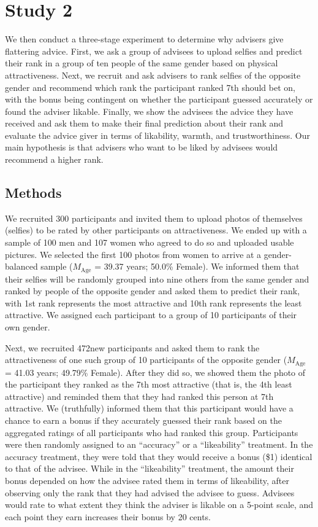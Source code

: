 \documentclass[
  man,floatsintext]{apa6}
\begin{document}
\hypertarget{study-2}{%
\section{Study 2}\label{study-2}}

We then conduct a three-stage experiment to determine why advisers give flattering advice. First, we ask a group of advisees to upload selfies and predict their rank in a group of ten people of the same gender based on physical attractiveness. Next, we recruit and ask advisers to rank selfies of the opposite gender and recommend which rank the participant ranked 7th should bet on, with the bonus being contingent on whether the participant guessed accurately or found the adviser likable. Finally, we show the advisees the advice they have received and ask them to make their final prediction about their rank and evaluate the advice giver in terms of likability, warmth, and trustworthiness. Our main hypothesis is that advisers who want to be liked by advisees would recommend a higher rank.

\hypertarget{methods-1}{%
\subsection{Methods}\label{methods-1}}

We recruited 300 participants and invited them to upload photos of themselves (selfies) to be rated by other participants on attractiveness. We ended up with a sample of 100 men and 107 women who agreed to do so and uploaded usable pictures. We selected the first 100 photos from women to arrive at a gender-balanced sample (\(M_{\text{Age}}\) = 39.37 years; 50.0\% Female). We informed them that their selfies will be randomly grouped into nine others from the same gender and ranked by people of the opposite gender and asked them to predict their rank, with 1st rank represents the most attractive and 10th rank represents the least attractive. We assigned each participant to a group of 10 participants of their own gender.

Next, we recruited 472new participants and asked them to rank the attractiveness of one such group of 10 participants of the opposite gender (\(M_{\text{Age}}\) = 41.03 years; 49.79\% Female). After they did so, we showed them the photo of the participant they ranked as the 7th most attractive (that is, the 4th least attractive) and reminded them that they had ranked this person at 7th attractive. We (truthfully) informed them that this participant would have a chance to earn a bonus if they accurately guessed their rank based on the aggregated ratings of all participants who had ranked this group. Participants were then randomly assigned to an ``accuracy'' or a ``likeability'' treatment. In the accuracy treatment, they were told that they would receive a bonus (\$1) identical to that of the advisee. While in the ``likeability'' treatment, the amount their bonus depended on how the advisee rated them in terms of likeability, after observing only the rank that they had advised the advisee to guess. Advisees would rate to what extent they think the adviser is likable on a 5-point scale, and each point they earn increases their bonus by 20 cents.
\end{document}
